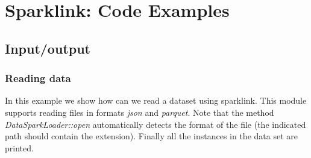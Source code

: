 \documentclass[10pt,a4paper]{article}
\begin{document}
\section{Sparklink: Code Examples}\label{sec:sparklink}

%
%		


\subsection{Input/output}\label{sec:sparklink:io}




\subsubsection{Reading data}\label{sec:sparklink:io:read}

In this example we show how can we read a dataset using sparklink. This module supports reading files in formats \textit{json} and \textit{parquet}. Note that the method \textit{DataSparkLoader::open} automatically detects the format of the file (the indicated path should contain the extension). Finally all the instances in the data set are printed.
\end{document}
